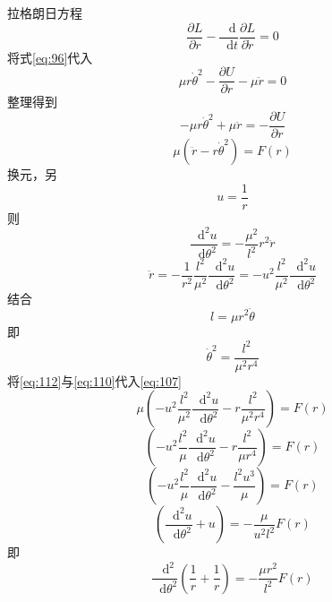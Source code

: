 \documentclass{article}
\newcommand*{\dif}{\mathop{}\!\mathrm{d}}
\begin{document}
拉格朗日方程
\begin{equation}
  \label{eq:104}
  \dfrac{\partial L}{\partial r} - \dfrac{\dif}{\dif t} \dfrac{\partial L}{\partial \dot{r}} = 0
\end{equation}
将式\ref{eq:96}代入
\begin{equation}
  \label{eq:105}
  \mu r \dot{\theta}^{2} - \dfrac{\partial U}{\partial r} - \mu \ddot{r} = 0
\end{equation}
整理得到
\begin{equation}
  \label{eq:106}
  -\mu r \dot{\theta}^{2} + \mu \ddot{r} = - \dfrac{\partial U}{\partial r}
\end{equation}
\begin{equation}
  \label{eq:107}
  \mu \left( \ddot{r} - r \dot{\theta}^{2} \right) = F(r)
\end{equation}
换元，另
\begin{equation}
  \label{eq:108}
  u = \dfrac{1}{r}
\end{equation}
则
\begin{equation}
  \label{eq:109}
  \dfrac{\dif^{2} u}{\dif \theta^{2}} = - \dfrac{\mu^{2}}{l^2} r^{2} \ddot{r}  
\end{equation}
\begin{equation}
  \label{eq:110}
  \ddot{r} = - \dfrac{1}{r^{2}} \dfrac{l^2}{\mu^{2}} \dfrac{\dif^{2} u}{\dif \theta^{2}} = - u^{2} \dfrac{l^2}{\mu^{2}} \dfrac{\dif^{2} u}{\dif \theta^{2}} 
\end{equation}
结合
\begin{equation}
  \label{eq:111}
  l = \mu r^{2} \dot{\theta}
\end{equation}
即
\begin{equation}
  \label{eq:112}
  \dot{\theta}^{2} = \dfrac{l^{2}}{\mu^{2} r^{4}} 
\end{equation}
将\ref{eq:112}与\ref{eq:110}代入\ref{eq:107}
\begin{equation}
  \label{eq:113}
  \mu \left( - u^{2} \dfrac{l^2}{\mu^{2}} \dfrac{\dif^{2} u}{\dif \theta^{2}}  - r \dfrac{l^{2}}{\mu^{2} r^{4}}  \right) = F(r)
\end{equation}
\begin{equation}
  \label{eq:114}
  \left( - u^{2} \dfrac{l^2}{\mu} \dfrac{\dif^{2} u}{\dif \theta^{2}}  - r \dfrac{l^{2}}{\mu r^{4}}  \right) = F(r)
\end{equation}
\begin{equation}
  \label{eq:115}
  \left( - u^{2} \dfrac{l^2}{\mu} \dfrac{\dif^{2} u}{\dif \theta^{2}}  - \frac{l^{2}u^{3}}{\mu}  \right) = F(r)
\end{equation}
\begin{equation}
  \label{eq:116}
    \left( \dfrac{\dif^{2} u}{\dif \theta^{2}}  + u   \right) = - \dfrac{\mu}{u^{2} l^{2}}  F(r)
\end{equation}
即
\begin{equation}
  \label{eq:117}
  \dfrac{\dif^{2}}{\dif \theta^{2}}\left( \dfrac{1}{r}  + \dfrac{1}{r}    \right) = - \dfrac{\mu r^{2}}{l^{2}}  F(r)
\end{equation}
\end{document}
